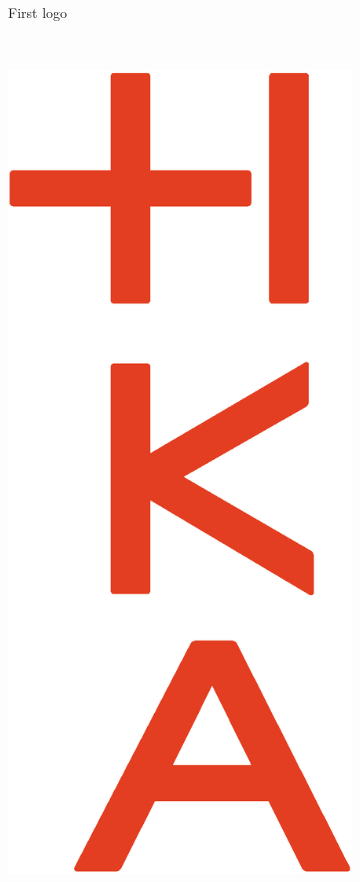 \begin{figure}[H]
\begin{subfigure}[b]{0.3\textwidth}
        \caption{First logo}
        \label{fig:logo1}
    \end{subfigure}
    ~ %
    \begin{subfigure}[b]{0.3\textwidth}
        \includegraphics[width=\textwidth]{logos/HKA_Bildmarke-v_CMYK}

\end{subfigure}
\end{figure}
